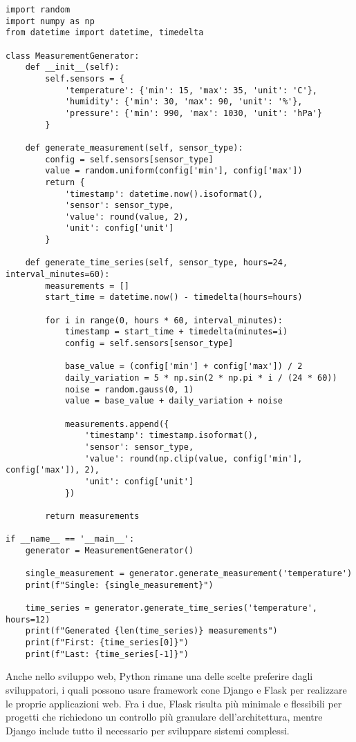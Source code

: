 \begin{lstlisting}[caption={Generazioni misuarzioni aleatorie in Python}, label=lst:measurements]
import random
import numpy as np
from datetime import datetime, timedelta

class MeasurementGenerator:
    def __init__(self):
        self.sensors = {
            'temperature': {'min': 15, 'max': 35, 'unit': 'C'},
            'humidity': {'min': 30, 'max': 90, 'unit': '%'},
            'pressure': {'min': 990, 'max': 1030, 'unit': 'hPa'}
        }

    def generate_measurement(self, sensor_type):
        config = self.sensors[sensor_type]
        value = random.uniform(config['min'], config['max'])
        return {
            'timestamp': datetime.now().isoformat(),
            'sensor': sensor_type,
            'value': round(value, 2),
            'unit': config['unit']
        }

    def generate_time_series(self, sensor_type, hours=24, interval_minutes=60):
        measurements = []
        start_time = datetime.now() - timedelta(hours=hours)

        for i in range(0, hours * 60, interval_minutes):
            timestamp = start_time + timedelta(minutes=i)
            config = self.sensors[sensor_type]

            base_value = (config['min'] + config['max']) / 2
            daily_variation = 5 * np.sin(2 * np.pi * i / (24 * 60))
            noise = random.gauss(0, 1)
            value = base_value + daily_variation + noise

            measurements.append({
                'timestamp': timestamp.isoformat(),
                'sensor': sensor_type,
                'value': round(np.clip(value, config['min'], config['max']), 2),
                'unit': config['unit']
            })

        return measurements

if __name__ == '__main__':
    generator = MeasurementGenerator()

    single_measurement = generator.generate_measurement('temperature')
    print(f"Single: {single_measurement}")

    time_series = generator.generate_time_series('temperature', hours=12)
    print(f"Generated {len(time_series)} measurements")
    print(f"First: {time_series[0]}")
    print(f"Last: {time_series[-1]}")
\end{lstlisting}

Anche nello sviluppo web, Python rimane una delle scelte preferire dagli sviluppatori, i quali possono usare framework cone Django e Flask \citep{django_2023, flask_2023} per realizzare le proprie applicazioni web. Fra i due, Flask risulta più minimale e flessibili per progetti che richiedono un controllo più granulare dell'architettura, mentre Django include tutto il necessario per sviluppare sistemi complessi.

